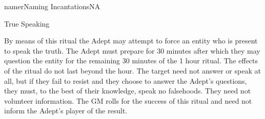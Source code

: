 \begin{college}[2.0]{namer}{Naming Incantations}{NA}
\begin{ritual}[R-7]{True Speaking}
\begin{effects}
By means of this ritual the Adept may attempt to force an entity who
is present to speak the truth. The Adept must prepare for 30 minutes
after which they may question the entity for the remaining 30 minutes
of the 1 hour ritual. The effects of the ritual do not last beyond the
hour. The target need not answer or speak at all, but if they fail to
resist and they choose to answer the Adept's questions, they must, to
the best of their knowledge, speak no falsehoods. They need not
volunteer information. The GM rolls for the success of this ritual and
need not inform the Adept's player of the result.
\end{effects}
\end{ritual}
\end{college}
